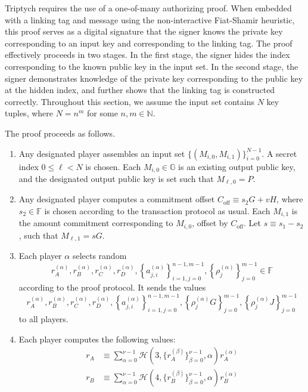 \documentclass{article}
\newcommand{\F}{\mathbb{F}}
\newcommand{\G}{\mathbb{G}}
\newcommand{\hs}{\mathcal{H}}
\begin{document}
Triptych requires the use of a one-of-many authorizing proof.
When embedded with a linking tag and message using the non-interactive Fiat-Shamir heuristic, this proof serves as a digital signature that the signer knows the private key corresponding to an input key and corresponding to the linking tag.
The proof effectively proceeds in two stages.
In the first stage, the signer hides the index corresponding to the known public key in the input set.
In the second stage, the signer demonstrates knowledge of the private key corresponding to the public key at the hidden index, and further shows that the linking tag is constructed correctly.
Throughout this section, we assume the input set contains $N$ key tuples, where $N = n^m$ for some $n,m \in \mathbb{N}$.

The proof proceeds as follows.
\begin{enumerate}
    \item Any designated player assembles an input set $\{(M_{i,0}, M_{i,1})\}_{i=0}^{N-1}$.
    A secret index $0 \leq \ell < N$ is chosen. Each $M_{i,0} \in \G$ is an existing output public key, and the designated output public key is set such that $M_{\ell,0} = P$.
    \item Any designated player computes a commitment offset $C_{\operatorname{off}} \equiv s_2 G + vH$, where $s_2 \in \F$ is chosen according to the transaction protocol as usual.
    Each $M_{i,1}$ is the amount commitment corresponding to $M_{i,0}$, offset by $C_{\operatorname{off}}$.
    Let $s \equiv s_1 - s_2$, such that $M_{\ell,1} = sG$.
    \item Each player $\alpha$ selects random $$r_A^{(\alpha)}, r_B^{(\alpha)}, r_C^{(\alpha)}, r_D^{(\alpha)}, \left\{a_{j,i}^{(\alpha)}\right\}_{i=1,j=0}^{n-1,m-1}, \left\{\rho_j^{(\alpha)}\right\}_{j=0}^{m-1} \in \F$$ according to the proof protocol.
    It sends the values $$r_A^{(\alpha)}, r_B^{(\alpha)}, r_C^{(\alpha)}, r_D^{(\alpha)}, \left\{a_{j,i}^{(\alpha)}\right\}_{i=1,j=0}^{n-1,m-1}, \left\{\rho_j^{(\alpha)}G\right\}_{j=0}^{m-1}, \left\{\rho_j^{(\alpha)}J\right\}_{j=0}^{m-1}$$ to all players.
    \item Each player computes the following values:
        \begin{align*}
            r_A &\equiv \sum_{\alpha=0}^{\nu-1} \hs(3, \{r_A^{(\beta)}\}_{\beta=0}^{\nu-1}, \alpha) r_A^{(\alpha)} \\
            r_B &\equiv \sum_{\alpha=0}^{\nu-1} \hs(4, \{r_B^{(\beta)}\}_{\beta=0}^{\nu-1}, \alpha) r_B^{(\alpha)} \\

\end{align*}
\end{enumerate}
\end{document}
